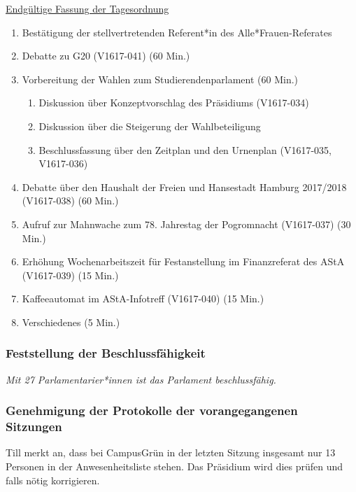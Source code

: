 \documentclass[ngerman,headheight=70pt]{scrartcl}
\begin{document}
    \underline{Endgültige Fassung der Tagesordnung}
    \begin{enumerate}[label={\textbf{Top \theenumi}},leftmargin=*]
        \item Bestätigung der stellvertretenden Referent*in des Alle*Frauen-Referates
        \item Debatte zu G20 (V1617-041) (60 Min.)
        \item Vorbereitung der Wahlen zum Studierendenparlament (60 Min.)
        \begin{enumerate}
            \item Diskussion über Konzeptvorschlag des Präsidiums (V1617-034)
            \item Diskussion über die Steigerung der Wahlbeteiligung
            \item Beschlussfassung über den Zeitplan und den Urnenplan
            (V1617-035, V1617-036)
        \end{enumerate}
        \item Debatte über den Haushalt der Freien und Hansestadt Hamburg
              2017/2018 (V1617-038) (60 Min.)
        \item Aufruf zur Mahnwache zum 78. Jahrestag der Pogromnacht (V1617-037) (30 Min.)
        \item Erhöhung Wochenarbeitszeit für Festanstellung im Finanzreferat des AStA (V1617-039) (15 Min.)
        \item Kaffeeautomat im AStA-Infotreff (V1617-040) (15 Min.)
        \item Verschiedenes (5 Min.)
    \end{enumerate}

    \subsubsection{Feststellung der Beschlussfähigkeit}

    \textit{Mit 27 Parlamentarier*innen ist das Parlament beschlussfähig.}

    \subsubsection{Genehmigung der Protokolle der vorangegangenen Sitzungen}

    Till merkt an, dass bei CampusGrün in der letzten Sitzung insgesamt nur 13
    Personen in der Anwesenheitsliste stehen. Das Präsidium wird dies prüfen
    und falls nötig korrigieren.
\end{document}

